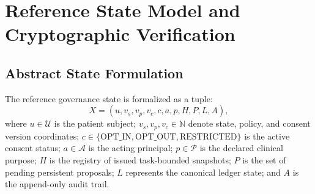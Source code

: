 \documentclass[runningheads]{llncs}
\begin{document}
\section{Reference State Model and Cryptographic Verification}
\label{sec:state_model}
\subsection{Abstract State Formulation}
The reference governance state is formalized as a tuple:
\begin{equation}
X = (u, v_s, v_p, v_c, c, a, p, H, P, L, A),
\end{equation}
where $u \in \mathcal{U}$ is the patient subject; $v_s, v_p, v_c \in \mathbb{N}$ denote state, policy, and consent version coordinates; $c \in \{\text{OPT\_IN}, \text{OPT\_OUT}, \text{RESTRICTED}\}$ is the active consent status; $a \in \mathcal{A}$ is the acting principal; $p \in \mathcal{P}$ is the declared clinical purpose; $H$ is the registry of issued task-bounded snapshots; $P$ is the set of pending persistent proposals; $L$ represents the canonical ledger state; and $A$ is the append-only audit trail.
\end{document}
